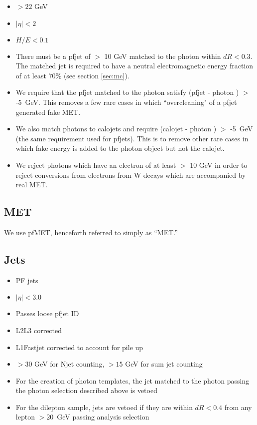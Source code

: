 \begin{itemize}
\item \pt $ > 22$ GeV
\item $|\eta| < 2$
\item $H/E < 0.1$
\item There must be a pfjet of \pt $ >$ 10 GeV 
matched to the photon within $dR < 0.3$. The matched jet is required to have 
a neutral electromagnetic energy fraction of at least 
70\% (see section \ref{sec:mc}).

\item 
  We require that the pfjet \pt matched to the photon satisfy
  (pfjet \pt - photon \pt) $>$ -5~GeV.
  This removes a few rare cases in which ``overcleaning" of a
  pfjet
  generated fake MET.

\item We also match photons to calojets and require (calojet \pt - photon \pt) $>$ -5~GeV
  (the same requirement used for pfjets). This is to remove other rare cases in which fake
  energy is added to the photon object but not the calojet.

\item We reject photons which have an electron of at least \pt $>$ 10 GeV in order to reject
  conversions from electrons from W decays which are accompanied by real MET.

\end{itemize}


\subsection{MET}

We use pfMET, henceforth referred to simply as ``MET.''


\subsection{Jets}
\label{sec:jetsel}

\begin{itemize}
\item PF jets
\item $|\eta| < 3.0$ %
\item Passes loose pfjet ID
\item L2L3 corrected
\item L1Fastjet corrected to account for pile up
\item \pt $ > 30$ GeV for Njet counting, \pt $ > 15$ GeV for sum jet \pt counting
\item For the creation of photon templates, the jet matched to the photon passing the photon selection described above is vetoed
\item For the dilepton sample, jets are vetoed if they are within $dR < 0.4$ from any lepton \pt $ > 20$~GeV passing analysis selection
\end{itemize}

